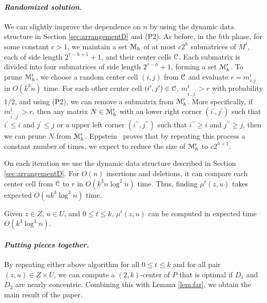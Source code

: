 \documentclass[11pt]{myclass}
\newcommand{\EuM}{\ensuremath{\EuScript{M}}}
\newcommand{\EuC}{\ensuremath{\EuScript{C}}}
\begin{document}
\paragraph{\textbf{\emph{Randomized solution.}}}
We can slightly improve the dependence on $n$ by using the dynamic data structure in Section \ref{sec:arrangementD} and (P2).  
As before, in the $h$th phase, for some constant $c>1$, we maintain a set $\EuM_{h}$ of at most $c2^h$ submatrices of $M^t$, each of side length $2^{\tau-h+1}+1$, and their center cells $\EuC$.  Each submatrix is divided into four submatrices of side length $2^{\tau-h}+1$, forming a set $\EuM^\prime_{h}$.  To prune $\EuM^\prime_{h}$, we choose a random center cell $(i,j)$ from $\EuC$ and evaluate $r = m^t_{i,j}$ in $O(k^3 n)$ time.  For each other center cell $(i^\prime, j^\prime) \in \EuC$, $m^t_{i^\prime,j^\prime} >r$ with probability $1/2$, and using (P2), we can remove a submatrix from $\EuM^\prime_{h}$. 
More specifically, if $m^t_{i^\prime,j^\prime}>r$, then any matrix $N \in \EuM^\prime_h$ with an lower right corner $(i^\prime, j^\prime)$ such that $i^\prime \leq i$ and $j^\prime \leq j$ or a upper left corner $(i^{\prime\prime}, j^{\prime\prime})$ such that $i^{\prime\prime} \geq i$ and $j^{\prime\prime} \geq j$, then we can prune $N$ from $\EuM_h^\prime$.  
Eppstein~\cite{Epp97} proves that by repeating this process a constant number of times, we expect to reduce the size of $\EuM^\prime_h$ to $c2^{h+1}$.





On each iteration we use the dynamic data structure described in Section \ref{sec:arrangementD}.  For $O(n)$ insertions and deletions, it can compare each center cell from $\EuC$ to $r$ in $O(k^{3} n \log^2 n)$ time.  
Thus, finding $\mu^t(z,u)$ takes expected $O(n k^{3} \log^3 n)$ time.  

\begin{lemma}
Given $z \in Z$, $u \in U$, and $0 \leq t \leq k$, 
$\mu^t(z,u)$ can be computed in expected time $O(k^3 \log^3 n)$.
\label{lem:nearR}
\end{lemma}





\paragraph{\textbf{\emph{Putting pieces together.}}}
By repeating either above algorithm for all $0 \leq t \leq k$ and for all pair $(z,u) \in Z \times U$, we can compute a $(2,k)$-center of $P$ that is optimal if $D_1$ and $D_2$ are nearly concentric.  Combining this with Lemma \ref{lem:far}, we obtain the main result of the paper.
\end{document}
